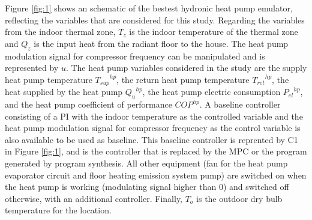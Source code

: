 Figure \ref{fig:1} shows an schematic of the bestest hydronic heat pump emulator, reflecting the variables that are considered for this study. Regarding the variables from the indoor thermal zone, $T_{z}$ is the indoor temperature of the thermal zone and $Q_{z}$ is the input heat from the radiant floor to the house. The heat pump modulation signal for compressor frequency can be manipulated and is represented by $u$. The heat pump variables considered in the study are the supply heat pump temperature ${T_{sup}}^{hp}$, the return heat pump temperature ${T_{ret}}^{hp}$, the heat supplied by the heat pump ${Q_{u}}^{hp}$, the heat pump electric consumption ${P_{el}}^{hp}$, and the heat pump coefficient of performance $COP^{hp}$. A baseline controller consisting of a PI with the indoor temperature as the controlled variable and the heat pump modulation signal for compressor frequency as the control variable is also available to be used as baseline. This baseline controller is reprented by C1 in Figure \ref{fig:1}, and is the controller that is replaced by the MPC or the program generated by program synthesis. All other equipment (fan for the heat pump evaporator circuit and floor heating emission system pump) are switched on when the heat pump is working (modulating signal higher than 0) and switched off otherwise, with an additional controller. Finally, $T_o$ is the outdoor dry bulb temperature for the location.

